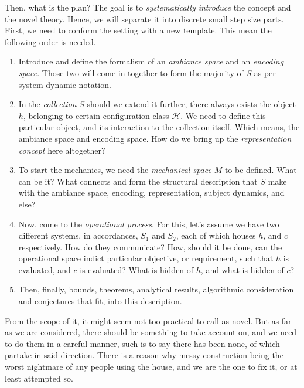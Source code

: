 Then, what is the plan? The goal is to \textit{systematically introduce} the concept and the novel theory. Hence, we will separate it into discrete small step size parts. First, we need to conform the setting with a new template. This mean the following order is needed. 
\begin{enumerate}[leftmargin=1cm,itemsep=2pt,topsep=2pt]
  \item Introduce and define the formalism of an \textit{ambiance space} and an \textit{encoding space}. Those two will come in together to form the majority of $S$ as per system dynamic notation. 
  \item In the \textit{collection} $S$ should we extend it further, there always exists the object $h$, belonging to certain configuration class $\mathcal{H}$. We need to define this particular object, and its interaction to the collection itself. Which means, the ambiance space and encoding space. How do we bring up the \textit{representation concept} here altogether? 
  \item To start the mechanics, we need the \textit{mechanical space} $M$ to be defined. What can be it? What connects and form the structural description that $S$ make with the ambiance space, encoding, representation, subject dynamics, and else? 
  \item Now, come to the \textit{operational process}. For this, let's assume we have two different systems, in accordances, $S_{1}$ and $S_{2}$, each of which houses $h$, and $c$ respectively. How do they communicate? How, should it be done, can the operational space indict particular objective, or requirement, such that $h$ is evaluated, and $c$ is evaluated? What is hidden of $h$, and what is hidden of $c$? 
  \item Then, finally, bounds, theorems, analytical results, algorithmic consideration and conjectures that fit, into this description. 
\end{enumerate}
From the scope of it, it might seem not too practical to call as novel. But as far as we are considered, there should be something to take account on, and we need to do them in a careful manner, such is to say there has been none, of which partake in said direction. There is a reason why messy construction being the worst nightmare of any people using the house, and we are the one to fix it, or at least attempted so. 